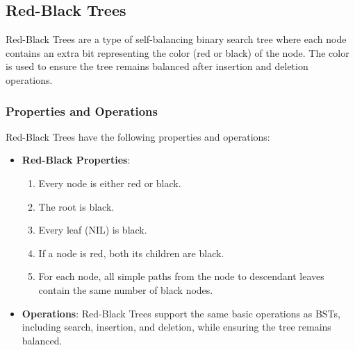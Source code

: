 \documentclass[12pt]{book} %
\begin{document}
\subsection{Red-Black Trees}
Red-Black Trees are a type of self-balancing binary search tree where each node contains an extra bit representing the color (red or black) of the node. The color is used to ensure the tree remains balanced after insertion and deletion operations.

\subsubsection{Properties and Operations}
Red-Black Trees have the following properties and operations:
\begin{itemize}
    \item \textbf{Red-Black Properties}:
        \begin{enumerate}
            \item Every node is either red or black.
            \item The root is black.
            \item Every leaf (NIL) is black.
            \item If a node is red, both its children are black.
            \item For each node, all simple paths from the node to descendant leaves contain the same number of black nodes.
        \end{enumerate}
    \item \textbf{Operations}: Red-Black Trees support the same basic operations as BSTs, including search, insertion, and deletion, while ensuring the tree remains balanced.
\end{itemize}
\end{document}
